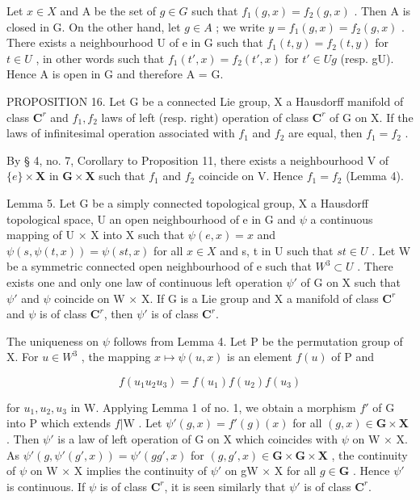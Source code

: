 Let \(x \in X\) and A be the set of \(g \in G\) such that \(f_{1}(g, x) = f_{2}(g, x)\) . Then A is closed in G. On the other hand, let \(g \in A\) ; we write \(y = f_{1}(g, x) = f_{2}(g, x)\) . There exists a neighbourhood U of e in G such that \(f_{1}(t, y) = f_{2}(t, y)\) for \(t \in U\) , in other words such that \(f_{1}(t', x) = f_{2}(t', x)\) for \(t' \in Ug\) (resp. gU). Hence A is open in G and therefore A = G.

PROPOSITION 16. Let G be a connected Lie group, X a Hausdorff manifold of class \(\mathbf{C}^r\) and \(f_1, f_2\) laws of left (resp. right) operation of class \(\mathbf{C}^r\) of G on X. If the laws of infinitesimal operation associated with \(f_1\) and \(f_2\) are equal, then \(f_1 = f_2\) .

By § 4, no. 7, Corollary to Proposition 11, there exists a neighbourhood V of \(\{e\} \times \mathbf{X}\) in \(\mathbf{G} \times \mathbf{X}\) such that \(f_{1}\) and \(f_{2}\) coincide on V. Hence \(f_{1} = f_{2}\) (Lemma 4).

Lemma 5. Let G be a simply connected topological group, X a Hausdorff topological space, U an open neighbourhood of e in G and \(\psi\) a continuous mapping of U × X into X such that \(\psi(e, x) = x\) and \(\psi(s, \psi(t, x)) = \psi(st, x)\) for all \(x \in X\) and s, t in U such that \(st \in U\) . Let W be a symmetric connected open neighbourhood of e such that \(W^{3} \subset U\) . There exists one and only one law of continuous left operation \(\psi'\) of G on X such that \(\psi'\) and \(\psi\) coincide on W × X. If G is a Lie group and X a manifold of class \(\mathbf{C}^r\) and \(\psi\) is of class \(\mathbf{C}^r\), then \(\psi'\) is of class \(\mathbf{C}^r\).

The uniqueness on \(\psi\) follows from Lemma 4. Let P be the permutation group of X. For \(u \in W^{3}\) , the mapping \(x \mapsto \psi(u, x)\) is an element \(f(u)\) of P and

\[
f \left(u _ {1} u _ {2} u _ {3}\right) = f \left(u _ {1}\right) f \left(u _ {2}\right) f \left(u _ {3}\right)
\]

for \(u_{1}, u_{2}, u_{3}\) in W. Applying Lemma 1 of no. 1, we obtain a morphism \(f'\) of G into P which extends \(f|\mathrm{W}\) . Let \(\psi'(g,x)=f'(g)(x)\) for all \((g,x)\in\mathbf{G}\times\mathbf{X}\) . Then \(\psi'\) is a law of left operation of G on X which coincides with \(\psi\) on W × X. As \(\psi'(g,\psi'(g',x))=\psi'(gg',x)\) for \((g,g',x)\in\mathbf{G}\times\mathbf{G}\times\mathbf{X}\) , the continuity of \(\psi\) on W × X implies the continuity of \(\psi'\) on gW × X for all \(g\in\mathbf{G}\) . Hence \(\psi'\) is continuous. If \(\psi\) is of class \(\mathbf{C}^r\), it is seen similarly that \(\psi'\) is of class \(\mathbf{C}^r\).

